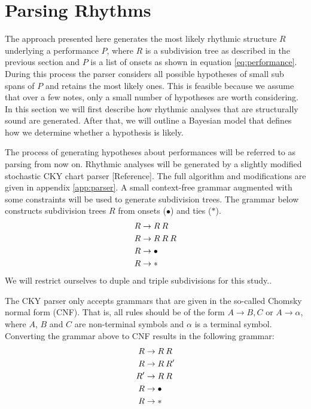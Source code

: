 \section{Parsing Rhythms}
\label{sec:parser}

The approach presented here generates the most likely rhythmic structure $R$ underlying a performance $P$, where $R$ is a subdivision tree as described in the previous section and $P$ is a list of onsets as shown in equation \ref{eq:performance}. During this process the parser considers all possible hypotheses of small sub spans of $P$ and retains the most likely ones. This is feasible because we assume that over a few notes, only a small number of hypotheses are worth considering. In this section we will first describe how rhythmic analyses that are structurally sound are generated. After that, we will outline a Bayesian model that defines how we determine whether a hypothesis is likely.

The process of generating hypotheses about performances will be referred to as parsing from now on. Rhythmic analyses will be generated by a slightly modified stochastic CKY chart parser [Reference]. The full algorithm and modifications are given in appendix \ref{app:parser}. A small context-free grammar augmented with some constraints will be used to generate subdivision trees. The grammar below constructs subdivision trees $R$ from onsets ($\bullet$) and ties ($*$).
\begin{align}
R &\rightarrow R\: R\\ \notag
R &\rightarrow R\: R\: R\\ \notag
R &\rightarrow \bullet\\ \notag
R &\rightarrow * \notag
\end{align}
We will restrict ourselves to duple and triple subdivisions for this study..

The CKY parser only accepts grammars that are given in the so-called Chomsky normal form (CNF). That is, all rules should be of the form $A \rightarrow B, C$ or $A \rightarrow \alpha$, where $A$, $B$ and $C$ are non-terminal symbols and $\alpha$ is a terminal symbol. Converting the grammar above to CNF results in the following grammar:
\begin{align}
\label{eq:grammar_cnf}
R &\rightarrow R\: R\\ \notag
R &\rightarrow R\: R'\\ \notag
R' &\rightarrow R\: R\\ \notag
R &\rightarrow \bullet\\ \notag
R &\rightarrow * \notag
\end{align}

